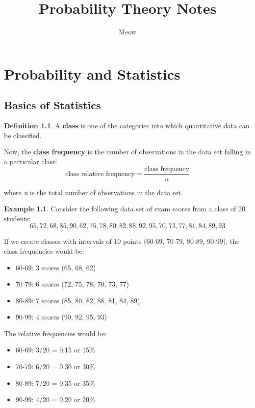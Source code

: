 \documentclass[12pt]{book}
\title{Probability Theory Notes}
\author{Meow}
\theoremstyle{definition}
\newtheorem{exmp}{Example}[section]
\newtheorem{definition}{Definition}[section]
\begin{document}
\maketitle
\tableofcontents

\chapter{Probability and Statistics}
\setcounter{section}{2}

\section{Basics of Statistics}
\begin{definition}
    A \textbf{class} is one of the categories into which quantitative data can be classified.
\end{definition}

Now, the \textbf{class frequency} is the number of observations in the data set falling in a particular class:
\begin{equation}
    \text{class relative frequency} = \frac{\text{class frequency}}{n}
\end{equation}

where \textit{n} is the total number of observations in the data set.

\begin{exmp}
    Consider the following data set of exam scores from a class of 20 students:
    \[ 65, 72, 68, 85, 90, 62, 75, 78, 80, 82, 88, 92, 95, 70, 73, 77, 81, 84, 89, 93 \]
    
    If we create classes with intervals of 10 points (60-69, 70-79, 80-89, 90-99), the class frequencies would be:
    \begin{itemize}
        \item 60-69: 3 scores (65, 68, 62)
        \item 70-79: 6 scores (72, 75, 78, 70, 73, 77)
        \item 80-89: 7 scores (85, 80, 82, 88, 81, 84, 89)
        \item 90-99: 4 scores (90, 92, 95, 93)
    \end{itemize}
    
    The relative frequencies would be:
    \begin{itemize}
        \item 60-69: 3/20 = 0.15 or 15\%
        \item 70-79: 6/20 = 0.30 or 30\%
        \item 80-89: 7/20 = 0.35 or 35\%
        \item 90-99: 4/20 = 0.20 or 20\%
    \end{itemize}
\end{exmp}
\end{document}
